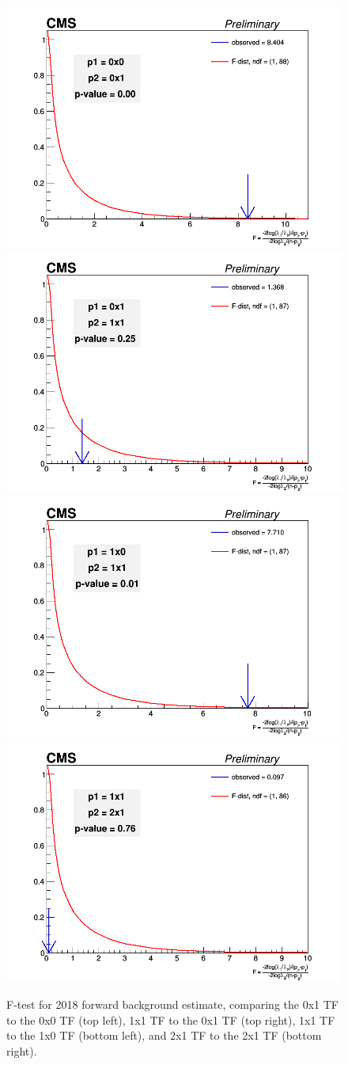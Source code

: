             \begin{figure}[!htbp]
                \begin{center}
                \includegraphics[width=0.4\linewidth]{Plots/tests/ftest_fwd_0x0_vs_0x1_2018.png}
                \includegraphics[width=0.4\linewidth]{Plots/tests/ftest_fwd_0x1_vs_1x1_2018.png}
                \includegraphics[width=0.4\linewidth]{Plots/tests/ftest_fwd_1x0_vs_1x1_2018.png}
                \includegraphics[width=0.4\linewidth]{Plots/tests/ftest_fwd_1x1_vs_2x1_2018.png}
    
                    \caption{F-test for 2018 forward background estimate, comparing the 0x1 TF to the 0x0 TF (top left), 1x1 TF to the 0x1 TF (top right), 1x1 TF to the 1x0 TF (bottom left), and 2x1 TF to the 2x1 TF (bottom right).}
                    \label{fig:ftest18}
                \end{center}
            \end{figure}
   
   
   
 